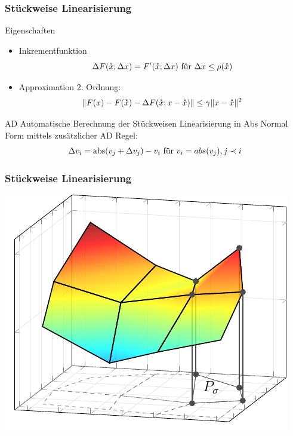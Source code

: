 \begin{frame}[<+->]
\frametitle{Stückweise Linearisierung}
\begin{block}{Eigenschaften}
 \begin{itemize}
  \item Inkrementfunktion 
    \[\Delta F(\mathring{x};\Delta x) = F'(\mathring{x};\Delta x)~ \text{für } \Delta x \leq \rho(\mathring{x})\]
  \item Approximation 2. Ordnung: \[\|F(x) - F(\mathring{x})- \Delta F(\mathring{x};x-\mathring{x})\| \leq \gamma \|x-\mathring{x}\|^2\]
 \end{itemize}
\end{block}
\begin{block}{AD}
 Automatische Berechnung der Stückweisen Linearisierung in Abs Normal Form mittels zusätzlicher AD Regel:
 \[
    \Delta v_i =\operatorname{abs}(v_j + \Delta v_j) - v_i \text{ für } v_i = abs(v_j), j\prec i
 \]
\end{block}

\end{frame}

\begin{frame}[<+->]
\frametitle{Stückweise Linearisierung}
\centering
\includegraphics[width=0.65\linewidth]{../dipl_tex/img/tikz/polyhedral_subdevision.pdf}
\end{frame}
